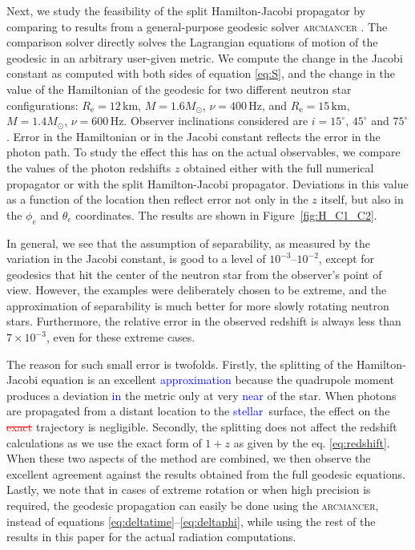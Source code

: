 \documentclass{aa}
\newcommand{\refe}[1]{\textcolor{blue}{{#1}}}
\newcommand{\refedel}[1]{\textcolor{red}{\sout{#1}}}
\newcommand{\Msun}{\ensuremath{M_{\odot}}}
\begin{document}
Next, we study the feasibility of the split Hamilton-Jacobi propagator by comparing to results from a general-purpose geodesic solver \textsc{arcmancer} \citep{PRJ16}.
The comparison solver directly solves the Lagrangian equations of motion of the geodesic in an arbitrary user-given metric. 
We compute the change in the Jacobi constant as computed with both sides of equation \eqref{eq:S}, and the change in the value of the Hamiltonian of the geodesic for two different neutron star configurations:
$R_{\mathrm{e}}=12\,\mathrm{km}$, $M=1.6\Msun$, $\nu=400\,\mathrm{Hz}$, and $R_{\mathrm{e}}=15\,\mathrm{km}$, $M=1.4\Msun$, $\nu=600\,\mathrm{Hz}$.
Observer inclinations considered are $i=15^\circ$, $45^\circ$ and $75^\circ$.
Error in the Hamiltonian or in the Jacobi constant reflects the error in the photon path.
To study the effect this has on the actual observables, we compare the values of the photon redshifts $z$ obtained either with the full numerical propagator or with the split Hamilton-Jacobi propagator.
Deviations in this value as a function of the location then reflect error not only in the $z$ itself, but also in the $\phi_e$ and $\theta_e$ coordinates.
The results are shown in Figure~\ref{fig:H_C1_C2}. 

In general, we see that the assumption of separability, as measured by the variation in the Jacobi constant, is good to a level of $10^{-3}$--$10^{-2}$, except for geodesics that hit the center of the neutron star from the observer's point of view. 
However, the examples were deliberately chosen to be extreme, and the approximation of separability is much better for more slowly rotating neutron stars.
Furthermore, the relative error in the observed redshift is always less than $7 \times 10^{-3}$, even for these extreme cases.

The reason for such small error is twofolds.
Firstly, the splitting of the Hamilton-Jacobi equation is an excellent \refe{approximation} because the quadrupole moment produces a deviation \refe{in} the metric only at very \refe{near} of the star.
When photons are propagated from a distant location to the \refe{stellar} surface, the effect on the \refedel{exact} trajectory is negligible.
Secondly, the splitting does not affect the redshift calculations as we use the exact form of $1+z$ as given by the eq. \eqref{eq:redshift}.
When these two aspects of the method are combined, we then observe the excellent agreement against the results obtained from the full geodesic equations.
Lastly, we note that in cases of extreme rotation or when high precision is required, the geodesic propagation can easily be done using the \textsc{arcmancer}, instead of equations \eqref{eq:deltatime}--\eqref{eq:deltaphi}, while using the rest of the results in this paper for the actual radiation computations.
\end{document}

